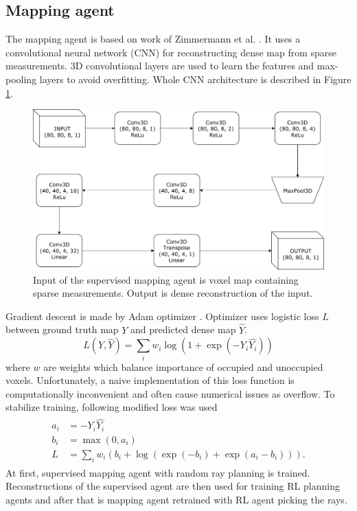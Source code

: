 \subsection{Mapping agent}
The mapping agent is based on work of Zimmermann et al. \cite{zimmermann2017}. It uses a convolutional neural network (CNN) for reconstructing dense map from sparse measurements. 3D convolutional layers are used to learn the features and max-pooling layers to avoid overfitting. Whole CNN architecture is described in Figure \ref{fig:supervised}.
\vspace{3mm}
\begin{figure}[!h]
\centering
\includegraphics[scale=0.6]{fig/supervised.pdf}
\caption[Mapping network architecture]{Input of the supervised mapping agent is voxel map containing sparse measurements. Output is dense reconstruction of the input.}
\label{fig:supervised}
\end{figure}

Gradient descent is made by Adam optimizer \cite{adam2014}. Optimizer uses logistic loss $L$ between ground truth map $Y$ and predicted dense map $\hat{Y}$.
\begin{equation} \label{eq:loglos}
L(Y, \hat{Y}) = \sum\limits_i w_i \log(1 + \exp(-Y_i \hat{Y_i}))
\end{equation}
where $w$ are weights which balance importance of occupied and unoccupied voxels.
\pagebreak
Unfortunately, a naive implementation of this loss function is computationally inconvenient and often cause numerical issues as overflow. To stabilize training, following modified loss was used \cite{matconvnet2015}
\begin{align} 
\begin{split}
a_i &= -Y_i \hat{Y_i} \\
b_i &= \max(0, a_i) \\
L &= \sum\limits_i w_i (b_i + \log(\exp(-b_i) + \exp(a_i-b_i))).
\end{split}
\end{align}
At first, supervised mapping agent with random ray planning is trained. Reconstructions of the supervised agent are then used for training RL planning agents and after that is mapping agent retrained with RL agent picking the rays.
